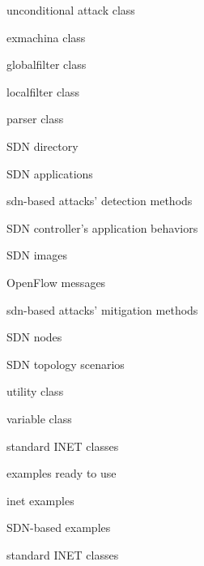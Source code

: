 \begin{description}[noitemsep]
			\item[] { unconditional attack class}		
		\item[] { exmachina class}
		\item[] { globalfilter class}
		\item[] { localfilter class}
		\item[] { parser class}	
		\item[] { SDN directory}
			\item[] { SDN applications}
			\item[] { sdn-based attacks' detection methods}
			\item[] { SDN controller's application behaviors}
			\item[] { SDN images}
			\item[] { OpenFlow messages}
			\item[] { sdn-based attacks' mitigation methods}
			\item[] { SDN nodes}
			\item[] { SDN topology scenarios}
			\item[] { utility class}
		\item[] { variable class}
		\item[] { standard INET classes}
	\item[] { examples ready to use}
		\item[] { inet examples}
		\item[] { SDN-based examples}
	\item[] { standard INET classes}
\end{description}

